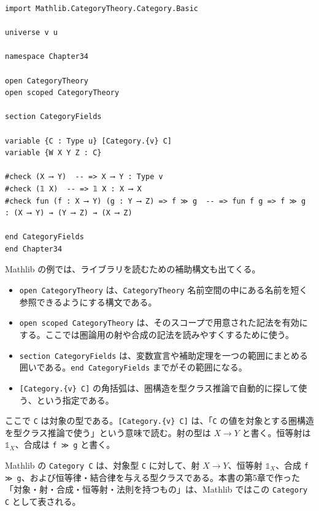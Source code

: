 \begin{listing}[htbp]
\begin{verbatim}
import Mathlib.CategoryTheory.Category.Basic

universe v u

namespace Chapter34

open CategoryTheory
open scoped CategoryTheory

section CategoryFields

variable {C : Type u} [Category.{v} C]
variable {W X Y Z : C}

#check (X ⟶ Y)  -- => X ⟶ Y : Type v
#check (𝟙 X)  -- => 𝟙 X : X ⟶ X
#check fun (f : X ⟶ Y) (g : Y ⟶ Z) => f ≫ g  -- => fun f g => f ≫ g : (X ⟶ Y) → (Y ⟶ Z) → (X ⟶ Z)

end CategoryFields
end Chapter34
\end{verbatim}
\caption{圏構造を仮定して射・恒等射・合成を見る}
\label{lst:ch34_category_basic}
\end{listing}

\begin{syntaxbox}
Mathlib の例では、ライブラリを読むための補助構文も出てくる。
\begin{itemize}
\item \texttt{open CategoryTheory} は、\texttt{CategoryTheory} 名前空間の中にある名前を短く参照できるようにする構文である。
\item \texttt{open scoped CategoryTheory} は、そのスコープで用意された記法を有効にする。ここでは圏論用の射や合成の記法を読みやすくするために使う。
\item \texttt{section CategoryFields} は、変数宣言や補助定理を一つの範囲にまとめる囲いである。\texttt{end CategoryFields} までがその範囲になる。
\item \texttt{[Category.\{v\} C]} の角括弧は、圏構造を型クラス推論で自動的に探して使う、という指定である。
\end{itemize}
\end{syntaxbox}

ここで \texttt{C} は対象の型である。\texttt{[Category.\{v\} C]} は、「\texttt{C} の値を対象とする圏構造を型クラス推論で使う」という意味で読む。射の型は \(X \longrightarrow Y\) と書く。恒等射は \(\mathbb{1}_X\)、合成は \texttt{f ≫ g} と書く。

\begin{definitionbox}
Mathlib の \texttt{Category C} は、対象型 \texttt{C} に対して、射 \(X \longrightarrow Y\)、恒等射 \(\mathbb{1}_X\)、合成 \texttt{f ≫ g}、および恒等律・結合律を与える型クラスである。本書の第5章で作った「対象・射・合成・恒等射・法則を持つもの」は、Mathlib ではこの \texttt{Category C} として表される。
\end{definitionbox}

